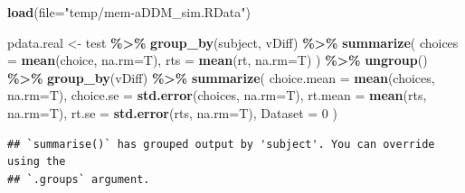\documentclass[
]{book}
\newenvironment{Shaded}{\begin{snugshade}}{\end{snugshade}}
\newcommand{\AttributeTok}[1]{\textcolor[rgb]{0.13,0.29,0.53}{#1}}
\newcommand{\DecValTok}[1]{\textcolor[rgb]{0.00,0.00,0.81}{#1}}
\newcommand{\FunctionTok}[1]{\textcolor[rgb]{0.13,0.29,0.53}{\textbf{#1}}}
\newcommand{\NormalTok}[1]{#1}
\newcommand{\OtherTok}[1]{\textcolor[rgb]{0.56,0.35,0.01}{#1}}
\newcommand{\SpecialCharTok}[1]{\textcolor[rgb]{0.81,0.36,0.00}{\textbf{#1}}}
\newcommand{\StringTok}[1]{\textcolor[rgb]{0.31,0.60,0.02}{#1}}
\begin{document}
\begin{Shaded}
\begin{Highlighting}[]
\FunctionTok{load}\NormalTok{(}\AttributeTok{file=}\StringTok{"temp/mem{-}aDDM\_sim.RData"}\NormalTok{)}

\NormalTok{pdata.real }\OtherTok{\textless{}{-}}\NormalTok{ test }\SpecialCharTok{\%\textgreater{}\%}
  \FunctionTok{group\_by}\NormalTok{(subject, vDiff) }\SpecialCharTok{\%\textgreater{}\%}
  \FunctionTok{summarize}\NormalTok{(}
    \AttributeTok{choices =} \FunctionTok{mean}\NormalTok{(choice, }\AttributeTok{na.rm=}\NormalTok{T),}
    \AttributeTok{rts =} \FunctionTok{mean}\NormalTok{(rt, }\AttributeTok{na.rm=}\NormalTok{T)}
\NormalTok{  ) }\SpecialCharTok{\%\textgreater{}\%}
  \FunctionTok{ungroup}\NormalTok{() }\SpecialCharTok{\%\textgreater{}\%}
  \FunctionTok{group\_by}\NormalTok{(vDiff) }\SpecialCharTok{\%\textgreater{}\%}
  \FunctionTok{summarize}\NormalTok{(}
    \AttributeTok{choice.mean =} \FunctionTok{mean}\NormalTok{(choices, }\AttributeTok{na.rm=}\NormalTok{T),}
    \AttributeTok{choice.se =} \FunctionTok{std.error}\NormalTok{(choices, }\AttributeTok{na.rm=}\NormalTok{T),}
    \AttributeTok{rt.mean =} \FunctionTok{mean}\NormalTok{(rts, }\AttributeTok{na.rm=}\NormalTok{T),}
    \AttributeTok{rt.se =} \FunctionTok{std.error}\NormalTok{(rts, }\AttributeTok{na.rm=}\NormalTok{T),}
    \AttributeTok{Dataset =} \DecValTok{0}
\NormalTok{  )}
\end{Highlighting}
\end{Shaded}

\begin{verbatim}
## `summarise()` has grouped output by 'subject'. You can override using the
## `.groups` argument.
\end{verbatim}
\end{document}
